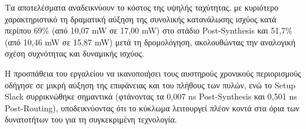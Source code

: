 \begin{table}[H]
    \centering
    \caption{Power Consumption per Category post Routing}
\end{table}

Τα αποτελέσματα αναδεικνύουν το κόστος της υψηλής ταχύτητας, με κυριότερο χαρακτηριστικό τη δραματική αύξηση της συνολικής κατανάλωσης ισχύος κατά περίπου 69\% (από 10,07 mW σε 17,00 mW) στο στάδιο Post-Synthesis και 51,7\% (από 10,46 mW σε 15,87 mW) μετά τη δρομολόγηση, ακολουθώντας την αναλογική σχέση συχνότητας και δυναμικής ισχύος. 

Η προσπάθεια του εργαλείου να ικανοποιήσει τους αυστηρούς χρονικούς περιορισμούς οδήγησε σε μικρή αύξηση της επιφάνειας και του πλήθους των πυλών, ενώ το Setup Slack συρρικνώθηκε σημαντικά (φτάνοντας τα 0,007 ns Post-Synthesis και 0,501 ns Post-Routing), υποδεικνύοντας ότι το κύκλωμα λειτουργεί πλέον κοντά στα όρια των δυνατοτήτων του για τη συγκεκριμένη τεχνολογία.